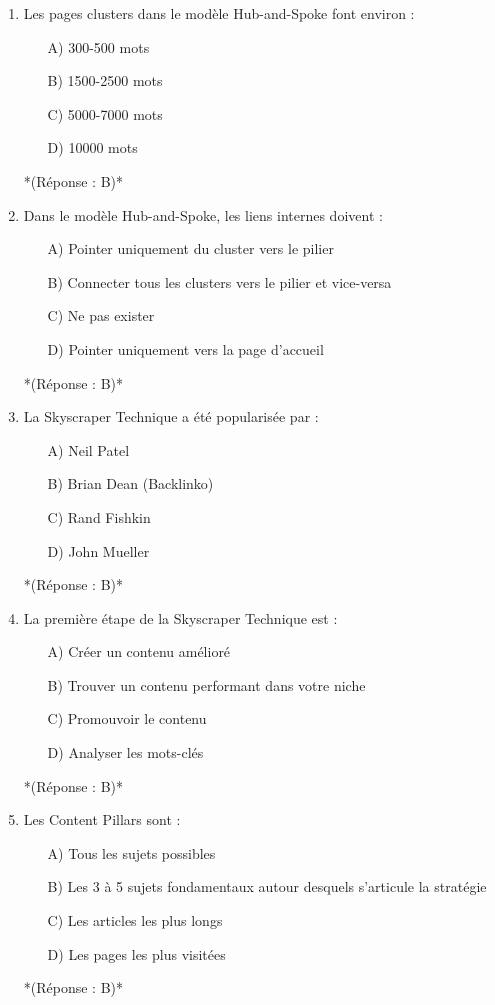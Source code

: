 \documentclass[12pt,a4paper,twoside]{report}
\begin{document}
\begin{enumerate}
\item Les pages clusters dans le modèle Hub-and-Spoke font environ :
\begin{itemize}
\item[A)] 300-500 mots
\item[B)] 1500-2500 mots
\item[C)] 5000-7000 mots
\item[D)] 10000 mots
\end{itemize}
*(Réponse : B)*

\item Dans le modèle Hub-and-Spoke, les liens internes doivent :
\begin{itemize}
\item[A)] Pointer uniquement du cluster vers le pilier
\item[B)] Connecter tous les clusters vers le pilier et vice-versa
\item[C)] Ne pas exister
\item[D)] Pointer uniquement vers la page d'accueil
\end{itemize}
*(Réponse : B)*

\item La Skyscraper Technique a été popularisée par :
\begin{itemize}
\item[A)] Neil Patel
\item[B)] Brian Dean (Backlinko)
\item[C)] Rand Fishkin
\item[D)] John Mueller
\end{itemize}
*(Réponse : B)*

\item La première étape de la Skyscraper Technique est :
\begin{itemize}
\item[A)] Créer un contenu amélioré
\item[B)] Trouver un contenu performant dans votre niche
\item[C)] Promouvoir le contenu
\item[D)] Analyser les mots-clés
\end{itemize}
*(Réponse : B)*

\item Les Content Pillars sont :
\begin{itemize}
\item[A)] Tous les sujets possibles
\item[B)] Les 3 à 5 sujets fondamentaux autour desquels s'articule la stratégie
\item[C)] Les articles les plus longs
\item[D)] Les pages les plus visitées
\end{itemize}
*(Réponse : B)*


\end{enumerate}
\end{document}
